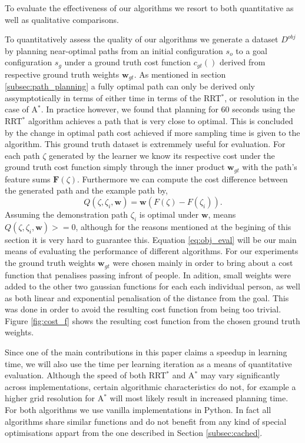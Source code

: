 \documentclass{article}  %
\begin{document}
	To evaluate the effectiveness of our algorithms we resort to both quantitative as well as qualitative comparisons.

	To quantitatively assess the quality of our algorithms we generate a dataset $D^{obj}$ by planning near-optimal paths from an initial configuration $s_o$ to a goal configuration $s_g$ under a ground truth cost function $c_{gt}()$ derived from respective ground truth weights $\mathbf{w}_{gt}$. As mentioned in section \ref{subsec:path_planning} a fully optimal path can only be derived only assymptotically in terms of either time in terms of the RRT$^*$, or resolution in the case of A$^*$. In practice however, we found that planning for 60 seconds using the RRT$^*$ algorithm achieves a path that is very close to optimal. This is concluded by the change in optimal path cost achieved if more sampling time is given to the algorithm. This ground truth dataset is extremmely useful for evaluation. For each path $\zeta$ generated by the learner we know its respective cost under the ground truth cost function simply through the inner product $\mathbf{w}_{gt}$ with the path's feature sums $\mathbf{F}(\zeta)$. Furthermore we can compute the cost difference between the generated path and the example path by,
	\begin{equation}
		Q(\zeta,\zeta_i,\mathbf{w}) = \mathbf{w}(F(\zeta)-F(\zeta_i)). \label{eq:obj_eval}
	\end{equation} 
	Assuming the demonstration path $\zeta_i$ is optimal under $\mathbf{w}$, means $Q(\zeta,\zeta_i,\mathbf{w})>=0$, although for the reasons mentioned at the begining of this section it is very hard to guarantee this. Equation \eqref{eq:obj_eval} will be our main means of evaluating the performance of different algorithms. For our experiments the ground truth weights $\mathbf{w}_{gt}$ were chosen mainly in order to bring about a cost function that penalises passing infront of people. In adition, small weights were added to the other two gaussian functions for each each individual person, as well as both linear and exponential penalisation of the distance from the goal. This was done in order to avoid the resulting cost function from being too trivial. Figure \ref{fig:cost_f} shows the resulting cost function from the chosen ground truth weights.

	Since one of the main contributions in this paper claims a speedup in learning time, we will also use the time per learning iteration as a means of quantitative evaluation. Although the speed of both RRT$^*$ and A$^*$ may vary significantly across implementations, certain algorithmic characteristics do not, for example a higher grid resolution for A$^*$ will most likely result in increased planning time. For both algorithms we use vanilla implementations in Python. In fact all algorithms share similar functions and do not benefit from any kind of special optimisations appart from the one described in Section \ref{subsec:cached}.
\end{document}
